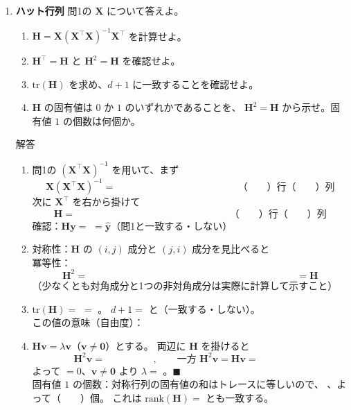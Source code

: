 \documentclass[a4paper,dvipdfmx]{jsarticle}
\newcommand{\提出期限}{2026年10月19日（月）}
\newcommand{\学籍番号}{0000000}
\newcommand{\氏名}{氏名を書く}
\newcommand{\提出日}{2026年10月19日}
\newenvironment{answer}{\begin{itembox}[l]{解答}}{\end{itembox}}
\begin{document}
\begin{enumerate}
  \item \textbf{ハット行列}\quad
    問1の $\bm{X}$ について答えよ。
    \begin{enumerate}
      \item $\bm{H} = \bm{X}(\bm{X}^\top\bm{X})^{-1}\bm{X}^\top$ を計算せよ。
      \item $\bm{H}^\top = \bm{H}$ と $\bm{H}^2 = \bm{H}$ を確認せよ。
      \item $\mathrm{tr}(\bm{H})$ を求め、$d+1$ に一致することを確認せよ。
      \item $\bm{H}$ の固有値は $0$ か $1$ のいずれかであることを、
        $\bm{H}^2 = \bm{H}$ から示せ。固有値 $1$ の個数は何個か。
    \end{enumerate}
    \begin{answer}
      \begin{enumerate}
        \item 問1の $(\bm{X}^\top\bm{X})^{-1}$ を用いて、まず
          \begin{equation*}
            \bm{X}(\bm{X}^\top\bm{X})^{-1} = \phantom{XXXXXXXXXXXXXX} \quad \text{（　　）行（　　）列}
          \end{equation*}
          次に $\bm{X}^\top$ を右から掛けて
          \begin{equation*}
            \bm{H} = \phantom{XXXXXXXXXXXXXXXXXX} \quad \text{（　　）行（　　）列}
          \end{equation*}
          確認：$\bm{H}\bm{y} = $ \phantom{XXXXXXXXXX} $= \hat{\bm{y}}$（問1と一致する・しない）
        \item 対称性：$\bm{H}$ の $(i,j)$ 成分と $(j,i)$ 成分を見比べると \phantom{XXXXXXXXXXXX} \\[1mm]
          冪等性：
          \begin{equation*}
            \bm{H}^2 = \phantom{XXXXXXXXXXXXXXXXXXXXXXXXXX} = \bm{H}
          \end{equation*}
          （少なくとも対角成分と1つの非対角成分は実際に計算して示すこと）
        \item $\mathrm{tr}(\bm{H}) = $ \phantom{XXXXXXXXXX} $=$ \phantom{XX}。
          $d+1 = $ \phantom{XX} と（一致する・しない）。\\
          この値の意味（自由度）：
        \item $\bm{H}\bm{v} = \lambda\bm{v}$（$\bm{v} \neq \bm{0}$）とする。
          両辺に $\bm{H}$ を掛けると
          \begin{equation*}
            \bm{H}^2\bm{v} = \phantom{XXXXXX}, \qquad \text{一方 } \bm{H}^2\bm{v} = \bm{H}\bm{v} = \phantom{XXXXXX}
          \end{equation*}
          よって \phantom{XXXXXXXX} $= 0$、$\bm{v} \neq \bm{0}$ より $\lambda = $ \phantom{XXXXXX}。\hfill $\blacksquare$ \\[1mm]
          固有値 $1$ の個数：対称行列の固有値の和はトレースに等しいので、
          \phantom{XXXXXXXXXXXXXXXX}、よって（　　）個。
          これは $\mathrm{rank}(\bm{H}) = $ \phantom{XX} とも一致する。
      \end{enumerate}
    \end{answer}


\end{enumerate}
\end{document}
